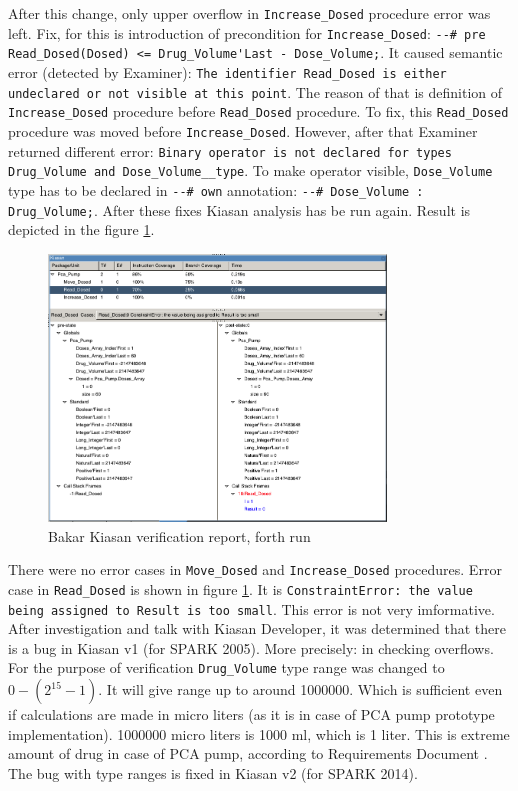 After this change, only upper overflow in \lstinline{Increase_Dosed} procedure error was left. Fix, for this is introduction of precondition for \lstinline{Increase_Dosed}: \lstinline{--# pre Read_Dosed(Dosed) <= Drug_Volume'Last - Dose_Volume;}. It caused semantic error (detected by Examiner): \lstinline{The identifier Read_Dosed is either undeclared or not visible at this point}. The reason of that is definition of \lstinline{Increase_Dosed} procedure before \lstinline{Read_Dosed} procedure. To fix, this \lstinline{Read_Dosed} procedure was moved before \lstinline{Increase_Dosed}. However, after that Examiner returned different error: \lstinline{Binary operator is not declared for types Drug_Volume and Dose_Volume__type}. To make operator visible, \lstinline{Dose_Volume} type has to be declared in \lstinline{--# own} annotation: \lstinline{--# Dose_Volume : Drug_Volume;}. After these fixes Kiasan analysis has be run again. Result is depicted in the figure \ref{figure:sparkverification:kiasanreport4}.

\begin{figure}[ht]%
    \begin{center}
        \includegraphics[width=0.8\textwidth]{figures/pca-pump-verification-step4.png}
    \end{center}
    \caption{Bakar Kiasan verification report, forth run}
    \label{figure:sparkverification:kiasanreport4}
\end{figure}

There were no error cases in \lstinline{Move_Dosed} and \lstinline{Increase_Dosed} procedures. Error case in \lstinline{Read_Dosed} is shown in figure \ref{figure:sparkverification:kiasanreport4}. It is \lstinline{ConstraintError: the value being assigned to Result is too small}. This error is not very imformative. After investigation and talk with Kiasan Developer, it was determined that there is a bug in Kiasan v1 (for SPARK 2005). More precisely: in checking overflows. For the purpose of verification \lstinline{Drug_Volume} type range was changed to $0 - (2^{15} - 1)$. It will give range up to around 1000000. Which is sufficient even if calculations are made in micro liters (as it is in case of PCA pump prototype implementation). 1000000 micro liters is 1000 ml, which is 1 liter. This is extreme amount of drug in case of PCA pump, according to Requirements Document \cite{PcaReq}. The bug with type ranges is fixed in Kiasan v2 (for SPARK 2014).

